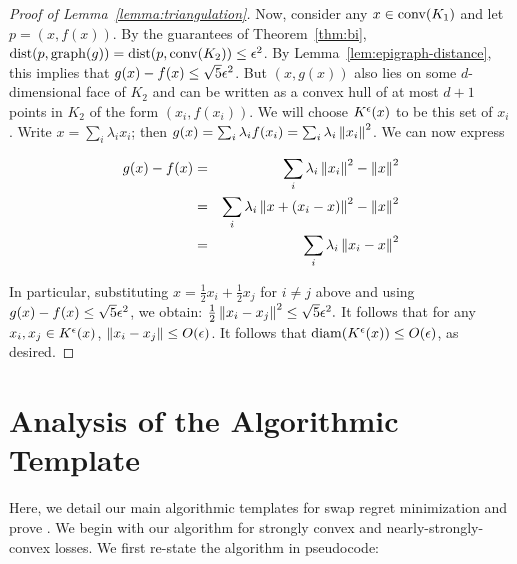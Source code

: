 \begin{proof}[Proof of Lemma~\ref{lemma:triangulation}]
Now, consider any $x \in \mathrm{conv}(K_1)$ and let $p = (x, f(x))$. By the guarantees of Theorem~\ref{thm:bi}, $\operatorname{dist}(p, \operatorname{graph}(g)) = \operatorname{dist}(p, \mathrm{conv}(K_2)) \leq \epsilon^2$. By Lemma~\ref{lem:epigraph-distance}, this implies that $g(x) - f(x) \leq \sqrt{5}\epsilon^2$. But $(x, g(x))$ also lies on some $d$-dimensional face of $K_2$ and can be written as a convex hull of at most $d+1$ points in $K_2$ of the form $(x_i, f(x_i))$. We will choose $K^{\epsilon}(x)$ to be this set of $x_i$. Write $x = \sum_i \lambda_i x_i$; then $g(x) = \sum_{i} \lambda_i f(x_i) = \sum_{i} \lambda_i \left\|x_i\right\|^2$. We can now express 

\begin{eqnarray*}
g(x) - f(x) &=& \sum_{i} \lambda_i\left\|x_i\right\|^2 - \left\|x\right\|^2 \\
&=& \sum_{i}\lambda_i\left\|x + (x_i - x)\right\|^2 - \left\|x\right\|^2 \\
&=& \sum_{i}\lambda_i \left\|x_i - x\right\|^2
\end{eqnarray*}

In particular, substituting $x = \frac{1}{2}x_i + \frac{1}{2}x_j$ for $i \neq j$ above and using  $g(x) - f(x) \leq \sqrt{5}\epsilon^2$, we obtain: $\frac{1}{2}\left\|x_i - x_j\right\|^2 \leq \sqrt{5}\epsilon^2.$
It follows that for any $x_i, x_j \in K^{\epsilon}(x)$, $\left\|x_i - x_j\right\| \leq O(\epsilon)$. It follows that $\operatorname{diam}(K^{\epsilon}(x)) \leq O(\epsilon)$, as desired. \end{proof}

\section{Analysis of the Algorithmic Template}\label{appendix:bm}

Here, we detail our main algorithmic templates for swap regret minimization and prove .  We begin with our algorithm for strongly convex and nearly-strongly-convex losses.  We first re-state the algorithm in pseudocode:

